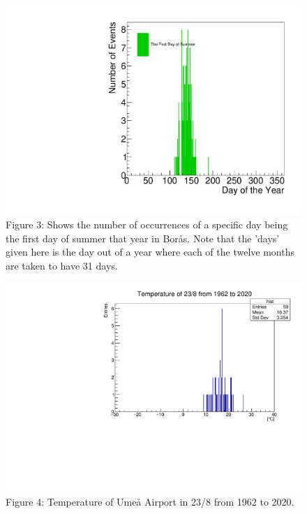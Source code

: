 \documentclass[a4, 12pt]{article}
\begin{document}
\begin{figure}[H]
\centering
\includegraphics[scale=0.45]{philipSummer.pdf}
\caption*{Figure 3: Shows the number of occurrences of a specific day being the first day of summer that year in Borås. Note that the 'days' given here is the day out of a year where each of the twelve months are taken to have 31 days.}
\end{figure}
\newpage




\begin{figure}[H]
\centering
\includegraphics[scale=0.6]{chrisFig1.pdf}
\caption*{Figure 4: Temperature of Umeå Airport in 23/8 from 1962 to 2020.}
\end{figure}
\end{document}
